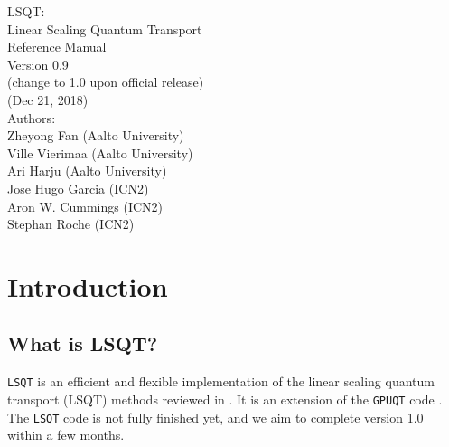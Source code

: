 \documentclass[12pt,a4paper]{report}
\begin{document}
\begin{center}
  \huge
  {
   \vspace*{1.0cm}
   LSQT: \\
   Linear Scaling Quantum Transport \\
   \vspace*{1.0cm}
   Reference Manual\\
   \vspace*{1.0cm}
   Version 0.9 \\
   (change to 1.0 upon official release)\\
   \vspace*{1.0cm}
   (Dec 21, 2018)\\
  \vspace*{2.0cm}
  }
  \large
  {
  Authors: \\
  Zheyong Fan (Aalto University)\\
  Ville Vierimaa (Aalto University)\\
  Ari Harju (Aalto University)\\
  Jose Hugo Garcia (ICN2)\\
  Aron W. Cummings (ICN2)\\
  Stephan Roche (ICN2)\\
  }
  \vspace*{1.0cm}
\end{center}

\tableofcontents

\chapter{Introduction\label{chapter:introduction}}

\section{What is LSQT?}

\verb"LSQT" is an efficient and flexible implementation of the linear scaling quantum transport (LSQT) methods reviewed in \citet{fan2018arxiv}. It is an extension of the \verb"GPUQT" code \citet{fan2018cpc}. The \verb"LSQT" code is not fully finished yet, and we aim to complete version 1.0 within a few months.
\end{document}
